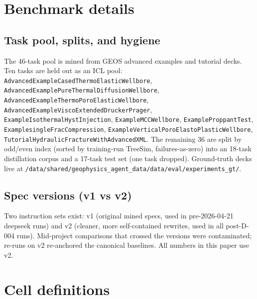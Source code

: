 \documentclass{article}
\begin{document}
\medskip

{
\small
}





\appendix

\section{Benchmark details}
\label{app:bench}

\subsection{Task pool, splits, and hygiene}
The 46-task pool is mined from GEOS advanced examples and tutorial decks. Ten tasks are held out as an ICL pool: \texttt{AdvancedExampleCasedThermoElasticWellbore}, \texttt{AdvancedExamplePureThermalDiffusionWellbore}, \texttt{AdvancedExampleThermoPoroElasticWellbore}, \texttt{AdvancedExampleViscoExtendedDruckerPrager}, \texttt{ExampleIsothermalHystInjection}, \texttt{ExampleMCCWellbore}, \texttt{ExampleProppantTest}, \texttt{ExamplesingleFracCompression}, \texttt{ExampleVerticalPoroElastoPlasticWellbore}, \texttt{TutorialHydraulicFractureWithAdvancedXML}. The remaining 36 are split by odd/even index (sorted by training-run TreeSim, failures-as-zero) into an 18-task distillation corpus and a 17-task test set (one task dropped). Ground-truth decks live at \texttt{/data/shared/geophysics\_agent\_data/data/eval/experiments\_gt/}.

\subsection{Spec versions (v1 vs v2)}
Two instruction sets exist: v1 (original mined specs, used in pre-2026-04-21 deepseek runs) and v2 (cleaner, more self-contained rewrites, used in all post-D-004 runs). Mid-project comparisons that crossed the versions were contaminated; re-runs on v2 re-anchored the canonical baselines. All numbers in this paper use v2.

\section{Cell definitions}
\label{app:cells}
\end{document}

